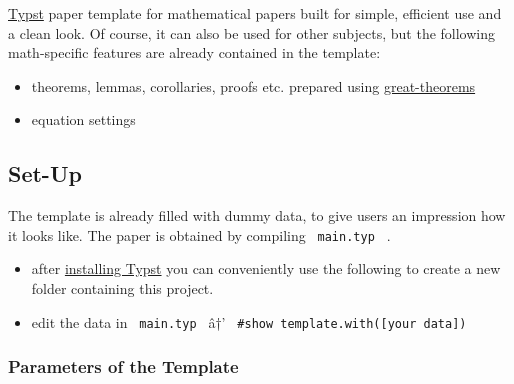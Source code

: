 \href{https://typst.app/home/}{Typst} paper template for mathematical
papers built for simple, efficient use and a clean look. Of course, it
can also be used for other subjects, but the following math-specific
features are already contained in the template:

\begin{itemize}
\tightlist
\item
  theorems, lemmas, corollaries, proofs etc. prepared using
  \href{https://typst.app/universe/package/great-theorems}{great-theorems}
\item
  equation settings
\end{itemize}

\subsection{Set-Up}\label{set-up}

The template is already filled with dummy data, to give users an
impression how it looks like. The paper is obtained by compiling
\texttt{\ main.typ\ } .

\begin{itemize}
\tightlist
\item
  after
  \href{https://github.com/typst/typst?tab=readme-ov-file\#installation}{installing
  Typst} you can conveniently use the following to create a new folder
  containing this project.
\end{itemize}

\begin{Shaded}
\begin{Highlighting}[]
\end{Highlighting}
\end{Shaded}

\begin{itemize}
\tightlist
\item
  edit the data in \texttt{\ main.typ\ } â†'
  \texttt{\ \#show\ template.with({[}your\ data{]})\ }
\end{itemize}

\subsubsection{Parameters of the
Template}\label{parameters-of-the-template}


